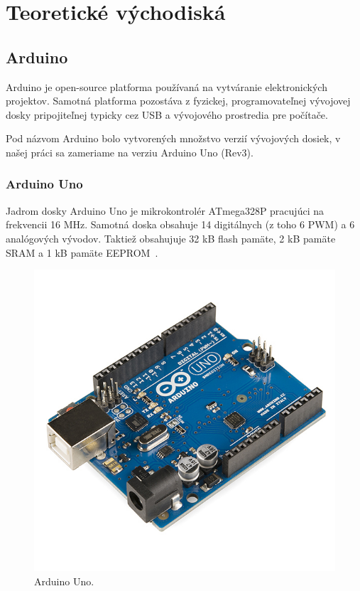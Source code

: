 \chapter{Teoretické východiská}

\section{Arduino}
Arduino je open-source platforma používaná na vytváranie elektronických projektov. Samotná platforma pozostáva z fyzickej, programovateľnej vývojovej dosky pripojiteľnej typicky cez USB a vývojového prostredia pre počítače.

Pod názvom Arduino bolo vytvorených množstvo verzií vývojových dosiek, v našej práci sa zameriame na verziu Arduino Uno (Rev3).

\subsection{Arduino Uno}
Jadrom dosky Arduino Uno je mikrokontrolér ATmega328P pracujúci na frekvencii 16 MHz. Samotná doska obsahuje 14 digitálnych (z toho 6 PWM) a 6 analógových vývodov. Taktiež obsahujuje 32 kB flash pamäte, 2 kB pamäte SRAM a 1 kB pamäte EEPROM~\cite{arduino-uno}.

\begin{figure}
    \centering
    \includegraphics{img/Arduino_Uno.jpg}
    \caption{Arduino Uno.}
\end{figure}

